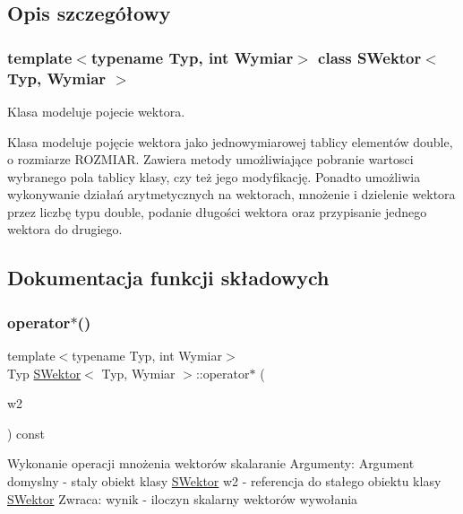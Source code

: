 \subsection{Opis szczegółowy}
\subsubsection*{template$<$typename Typ, int Wymiar$>$\newline
class S\+Wektor$<$ Typ, Wymiar $>$}

Klasa modeluje pojecie wektora. 

Klasa modeluje pojęcie wektora jako jednowymiarowej tablicy elementów double, o rozmiarze R\+O\+Z\+M\+I\+AR. Zawiera metody umożliwiające pobranie wartosci wybranego pola tablicy klasy, czy też jego modyfikację. Ponadto umożliwia wykonywanie działań arytmetycznych na wektorach, mnożenie i dzielenie wektora przez liczbę typu double, podanie długości wektora oraz przypisanie jednego wektora do drugiego. 

\subsection{Dokumentacja funkcji składowych}
\mbox{\label{classSWektor_a216a89c4fa018c75ae11af6e0cf26b23}} 
\subsubsection{\texorpdfstring{operator$\ast$()}{operator*()}\hspace{0.1cm}{\footnotesize\ttfamily [1/2]}}
{\footnotesize\ttfamily template$<$typename Typ, int Wymiar$>$ \\
Typ \hyperlink{classSWektor}{S\+Wektor}$<$ Typ, Wymiar $>$\+::operator$\ast$ (\begin{DoxyParamCaption}\item[{const \hyperlink{classSWektor}{S\+Wektor}$<$ Typ, Wymiar $>$ \&}]{w2 }\end{DoxyParamCaption}) const}

Wykonanie operacji mnożenia wektorów skalaranie Argumenty\+: Argument domyslny -\/ staly obiekt klasy \hyperlink{classSWektor}{S\+Wektor} w2 -\/ referencja do stałego obiektu klasy \hyperlink{classSWektor}{S\+Wektor} Zwraca\+: wynik -\/ iloczyn skalarny wektorów wywołania \mbox{\label{classSWektor_a58efd989f2647747bcc68e9650e38647}} 
